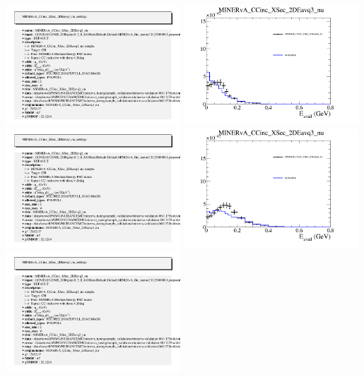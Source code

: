 \documentclass{article}
\begin{document}
\includegraphics[width=0.49\textwidth]{figures/nuisance_MINERvA_CCinc_XSec_2DEavq3_nu_info.png}
\centering
\includegraphics[width=0.49\textwidth]{figures/nuisance_MINERvA_CCinc_XSec_2DEavq3_nu_slice_2_comp.png}
\includegraphics[width=0.49\textwidth]{figures/nuisance_MINERvA_CCinc_XSec_2DEavq3_nu_info.png}
\centering
\includegraphics[width=0.49\textwidth]{figures/nuisance_MINERvA_CCinc_XSec_2DEavq3_nu_slice_3_comp.png}
\includegraphics[width=0.49\textwidth]{figures/nuisance_MINERvA_CCinc_XSec_2DEavq3_nu_info.png}
\end{document}

